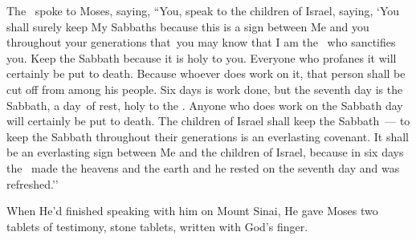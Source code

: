 \begin{inparaenum}
   The \lord\ spoke to Moses, saying,%
   ``You, speak to the children of Israel, saying, `You shall surely keep My Sabbaths because this is a sign between Me and you throughout your generations that\understood\ you may know that I am the \lord\ who sanctifies you.%
   Keep the Sabbath because it is holy to you. Everyone who profanes it will certainly be put to death. Because whoever does work on it, that person shall be cut off from among his people.%
   Six days is work done, but the seventh day is the Sabbath, a day\understood\ of rest, holy to the \lord. Anyone who does work on the Sabbath day will certainly be put to death.%
   The children of Israel shall keep the Sabbath~--- to keep the Sabbath throughout their generations is an everlasting covenant.%
   It shall be an everlasting sign between Me and the children of Israel, because in six days the \lord\ made the heavens and the earth and he rested on the seventh day and was refreshed.''%
  
   When He'd finished speaking with him on Mount Sinai, He gave Moses two tablets of testimony, stone tablets, written with God's finger.%
\end{inparaenum}
